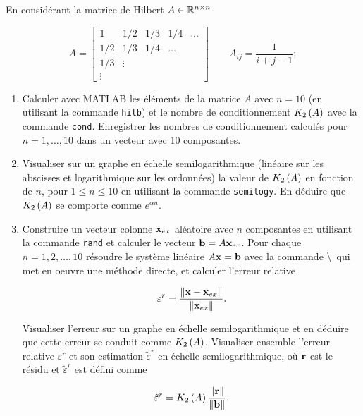 En considérant la matrice de Hilbert $A \in \mathbb{R}^{n \times n}$

\begin{equation*}
  A = \begin{bmatrix}
        1                & 1/2      & 1/3      & 1/4      & \dots \\
        1/2      & 1/3      & 1/4      & \dots            &       \\
        1/3      & \vdots           &                  &                  &       \\
        \vdots           &                  &                  &                  &      
      \end{bmatrix}
      \quad \quad 
      A_{ij} = \dfrac{1}{i+j-1}
      ;
\end{equation*}

\begin{enumerate}[label=\alph*)]
  \item Calculer avec \textsc{MATLAB} les éléments de la matrice $A$ avec $n = 10$ (en utilisant la commande \texttt{hilb}) et le nombre de conditionnement $K_{2}\left(A\right)$ avec la commande \texttt{cond}.
        Enregistrer les nombres de conditionnement calculés pour $n = 1, \dots , 10$ dans un vecteur avec 10 composantes.
        
  \item Visualiser sur un graphe en échelle semilogarithmique (linéaire sur les abscisses et logarithmique sur les ordonnées) la valeur de $K_{2}\left(A\right)$ en fonction de $n$, pour $1 \leq n \leq 10$ en utilisant la commande \texttt{semilogy}.
        En déduire que $K_{2}\left(A\right)$ se comporte comme $e^{\alpha n}$.
        
  \item Construire un vecteur colonne $\mathbf{x}_{e x}$ aléatoire avec $n$ composantes en utilisant la commande \texttt{rand} et calculer le vecteur $\mathbf{b} = A \mathbf{x}_{e x}$.
        Pour chaque $n = 1, 2, \dots , 10$ résoudre le système linéaire $A \mathbf{x} = \mathbf{b}$ avec la commande \textbackslash \ qui met en oeuvre une méthode directe, et calculer l'erreur relative
  
        \begin{equation}
        \label{eq:err}
          \varepsilon^{r} = \dfrac{\left\lVert\mathbf{x} - \mathbf{x}_{e x}\right\rVert}{\left\lVert\mathbf{x}_{e x}\right\rVert}.
        \end{equation}
        
        Visualiser l'erreur sur un graphe en échelle semilogarithmique et en déduire que cette erreur se conduit comme $K_{2}\left(A\right)$.
        Visualiser ensemble l'erreur relative $\varepsilon^{r}$ et son estimation $\tilde{\varepsilon}^{r}$ en échelle semilogarithmique, où $\mathbf{r}$ est le résidu et $\tilde{\varepsilon}^{r}$ est défini comme
        
        \begin{equation}
        \label{eq:tildeerr}
          \tilde{\varepsilon}^{r}
          = K_{2}\left(A\right) \frac{\left\lVert\mathbf{r}\right\rVert}{\left\lVert\mathbf{b}\right\rVert}.
        \end{equation}
        
         
        
\end{enumerate}


